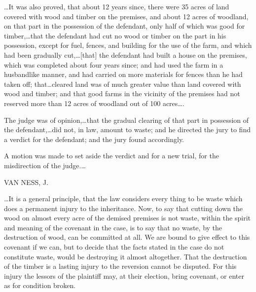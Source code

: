 \dots It was also proved, that about 12 years since, there were 35 acres of
land covered with wood and timber on the premises, and about 12 acres of
woodland, on that part in the possession of the defendant, only half of which
was good for timber,\dots that the defendant had cut no wood or timber on
the part in his possession, except for fuel, fences, and building for the use
of the farm, and which had been gradually cut,\dots [that] the defendant had
built a house on the premises, which was completed about four years since; and
had used the farm in a husbandlike manner, and had carried on more materials
for fences than he had taken off; that\dots cleared land was of much greater
value than land covered with wood and timber; and that good farms in the
vicinity of the premises had not reserved more than 12 acres of woodland out of
100 acres\dots.

The judge was of opinion,\dots that the gradual clearing of that part in
possession of the defendant,\dots did not, in law, amount to waste; and he
directed the jury to find a verdict for the defendant; and the jury found
accordingly.

A motion was made to set aside the verdict and for a new trial, for the
misdirection of the judge.\dots

VAN NESS, J.

\dots It is a general principle, that the law considers every thing to be
waste which does a permanent injury to the inheritance. Now, to say that
cutting down the wood on almost every acre of the demised premises is not
waste, within the spirit and meaning of the covenant in the case, is to say
that no waste, by the destruction of wood, can be committed at all. We are
bound to give effect to this covenant if we can, but to decide that the facts
stated in the case do not constitute waste, would be destroying it almost
altogether. That the destruction of the timber is a lasting injury to the
reversion cannot be disputed. For this injury the lessors of the plaintiff may,
at their election, bring covenant, or enter as for condition broken. 

